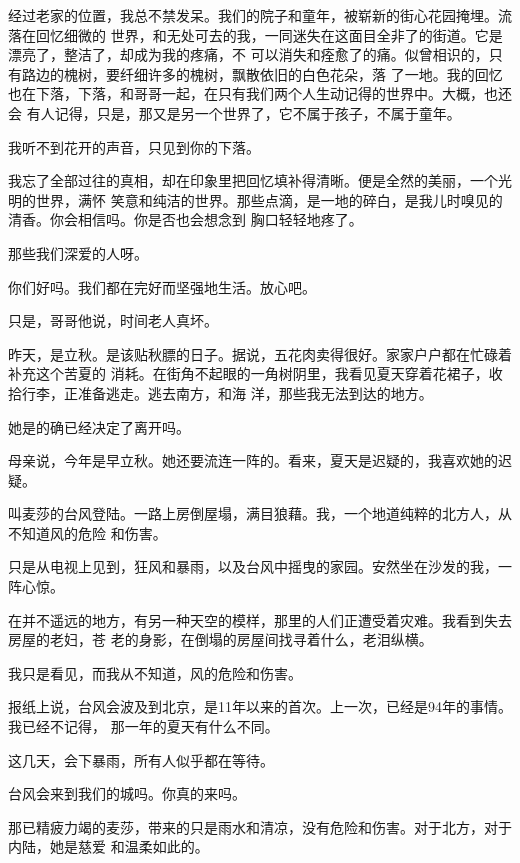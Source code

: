 \documentclass[12pt,a4paper]{article}
\def\blankrev{\vspace{1ex}}									%
\begin{document}
		经过老家的位置，我总不禁发呆。我们的院子和童年，被崭新的街心花园掩埋。流落在回忆细微的
	世界，和无处可去的我，一同迷失在这面目全非了的街道。它是漂亮了，整洁了，却成为我的疼痛，不
	可以消失和痊愈了的痛。似曾相识的，只有路边的槐树，要纤细许多的槐树，飘散依旧的白色花朵，落
	了一地。我的回忆也在下落，下落，和哥哥一起，在只有我们两个人生动记得的世界中。大概，也还会
	有人记得，只是，那又是另一个世界了，它不属于孩子，不属于童年。

		\blankrev
		我听不到花开的声音，只见到你的下落。

		我忘了全部过往的真相，却在印象里把回忆填补得清晰。便是全然的美丽，一个光明的世界，满怀
	笑意和纯洁的世界。那些点滴，是一地的碎白，是我儿时嗅见的清香。你会相信吗。你是否也会想念到
	胸口轻轻地疼了。

		\blankrev
		那些我们深爱的人呀。\par
		你们好吗。我们都在完好而坚强地生活。放心吧。

		只是，哥哥他说，时间老人真坏。

	\endwriting



		昨天，是立秋。是该贴秋膘的日子。据说，五花肉卖得很好。家家户户都在忙碌着补充这个苦夏的
	消耗。在街角不起眼的一角树阴里，我看见夏天穿着花裙子，收拾行李，正准备逃走。逃去南方，和海
	洋，那些我无法到达的地方。

		她是的确已经决定了离开吗。

		母亲说，今年是早立秋。她还要流连一阵的。看来，夏天是迟疑的，我喜欢她的迟疑。


		叫麦莎的台风登陆。一路上房倒屋塌，满目狼藉。我，一个地道纯粹的北方人，从不知道风的危险
	和伤害。

		只是从电视上见到，狂风和暴雨，以及台风中摇曳的家园。安然坐在沙发的我，一阵心惊。

		在并不遥远的地方，有另一种天空的模样，那里的人们正遭受着灾难。我看到失去房屋的老妇，苍
	老的身影，在倒塌的房屋间找寻着什么，老泪纵横。

		我只是看见，而我从不知道，风的危险和伤害。

		报纸上说，台风会波及到北京，是11年以来的首次。上一次，已经是94年的事情。我已经不记得，
	那一年的夏天有什么不同。

		这几天，会下暴雨，所有人似乎都在等待。

		台风会来到我们的城吗。你真的来吗。

		那已精疲力竭的麦莎，带来的只是雨水和清凉，没有危险和伤害。对于北方，对于内陆，她是慈爱
	和温柔如此的。
\end{document}
